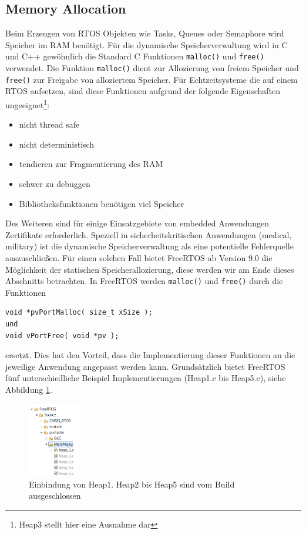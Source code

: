 \documentclass[ngerman]{seminarvorlage}
\begin{document}
\subsection{Memory Allocation}
Beim Erzeugen von RTOS Objekten wie Tasks, Queues oder Semaphore wird Speicher im RAM benötigt. Für die dynamische Speicherverwaltung wird in C und C++ ge\-wöhnlich die Standard C Funktionen \verb|malloc()| und \verb|free()| verwendet. Die Funktion \verb|malloc()| dient zur Allozierung von freiem Speicher und \verb|free()| zur Freigabe von alloziertem Speicher. Für Echtzeitsysteme die auf einem RTOS aufsetzen, sind diese Funktionen aufgrund der folgende Eigenschaften\cite{MasteringFreeRtos} ungeeignet\footnote{Heap3 stellt hier eine Ausnahme dar}:
\begin{itemize}
	\item nicht thread safe
	\item nicht deterministisch
	\item tendieren zur Fragmentierung des RAM
	\item schwer zu debuggen
	\item Bibliotheksfunktionen benötigen viel Speicher
\end{itemize}
Des Weiteren sind für einige Einsatzgebiete von embedded Anwendungen Zertifikate erforderlich. Speziell in sicherheitskritischen Anwendungen (medical, military) ist die dynamische Speicherverwaltung als eine potentielle Fehlerquelle auszuschließen. Für einen solchen Fall bietet FreeRTOS ab Version 9.0 die Möglichkeit der statischen Speicherallozierung, diese werden wir am Ende dieses Abschnitts betrachten. In FreeRTOS werden  \verb|malloc()| und \verb|free()| durch die Funktionen  
\begin{lstlisting}[label=lst:vPortMallocFree, numbers = none]
void *pvPortMalloc( size_t xSize );
und
void vPortFree( void *pv );
\end{lstlisting}
ersetzt. Dies hat den Vorteil, dass die Implementierung dieser Funktionen an die jeweilige Anwendung angepasst werden kann. Grundsätzlich bietet FreeRTOS fünf unterschiedliche Beispiel Implementierungen (Heap1.c bis Heap5.c), siehe Abbildung \ref{fig:HeapsEclipse}. 
\begin{figure}[htb!]
	\centering
		\includegraphics[width=0.2\textwidth]{Pictures/Eclipse/Heaps.png}
	\caption{Einbindung von Heap1. Heap2 bis Heap5 sind vom Build ausgeschlossen}
	\label{fig:HeapsEclipse}
\end{figure}   
\end{document}
